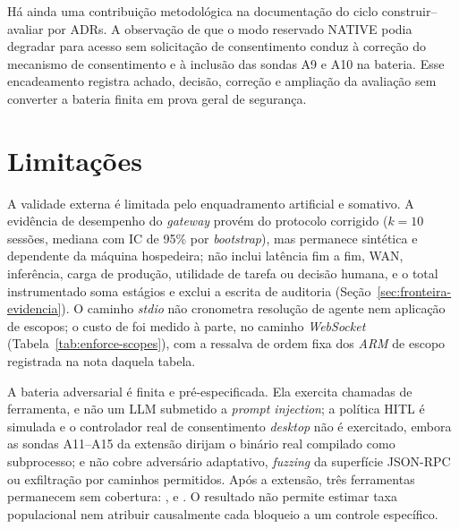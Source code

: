 Há ainda uma contribuição metodológica na documentação do ciclo construir--avaliar por ADRs. A observação de que o modo reservado NATIVE podia degradar para acesso sem solicitação de consentimento conduz à correção do mecanismo de consentimento e à inclusão das sondas A9 e A10 na bateria. Esse encadeamento registra achado, decisão, correção e ampliação da avaliação sem converter a bateria finita em prova geral de segurança.

\section{Limitações}
A validade externa é limitada pelo enquadramento artificial e somativo. A evidência de desempenho do \textit{gateway} provém do protocolo corrigido ($k=10$ sessões, mediana com IC de 95\% por \textit{bootstrap}), mas permanece sintética e dependente da máquina hospedeira; não inclui latência fim a fim, WAN, inferência, carga de produção, utilidade de tarefa ou decisão humana, e o total instrumentado soma estágios e exclui a escrita de auditoria (Seção~\ref{sec:fronteira-evidencia}). O caminho \textit{stdio} não cronometra resolução de agente nem aplicação de escopos; o custo de  foi medido à parte, no caminho \textit{WebSocket} (Tabela~\ref{tab:enforce-scopes}), com a ressalva de ordem fixa dos \textit{ARM} de escopo registrada na nota daquela tabela.

A bateria adversarial é finita e pré-especificada. Ela exercita chamadas de ferramenta, e não um LLM submetido a \textit{prompt injection}; a política HITL é simulada e o controlador real de consentimento \textit{desktop} não é exercitado, embora as sondas A11--A15 da extensão dirijam o binário real compilado como subprocesso; e não cobre adversário adaptativo, \textit{fuzzing} da superfície JSON-RPC ou exfiltração por caminhos permitidos. Após a extensão, três ferramentas permanecem sem cobertura: ,  e . O resultado não permite estimar taxa populacional nem atribuir causalmente cada bloqueio a um controle específico.

